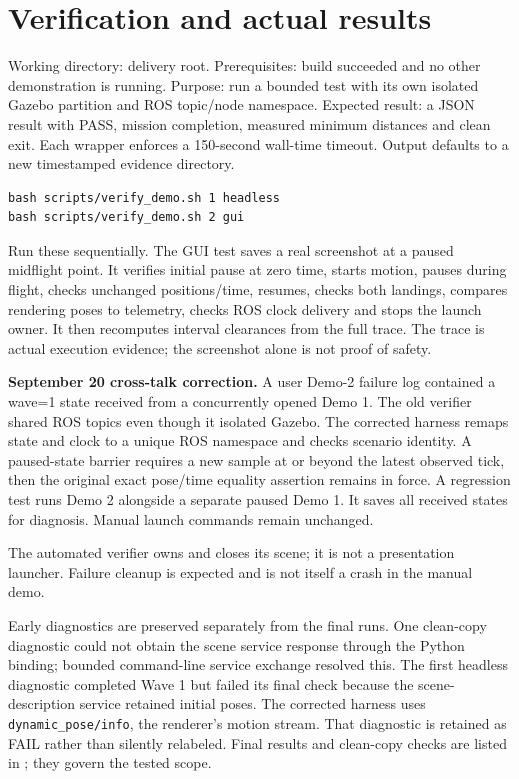 \section{Verification and actual results}
Working directory: delivery root. Prerequisites: build succeeded and no other demonstration is running. Purpose: run a bounded test with its own isolated Gazebo partition and ROS topic/node namespace. Expected result: a JSON result with PASS, mission completion, measured minimum distances and clean exit. Each wrapper enforces a 150-second wall-time timeout. Output defaults to a new timestamped evidence directory.
\begin{lstlisting}
bash scripts/verify_demo.sh 1 headless
bash scripts/verify_demo.sh 2 gui
\end{lstlisting}
Run these sequentially. The GUI test saves a real screenshot at a paused midflight point. It verifies initial pause at zero time, starts motion, pauses during flight, checks unchanged positions/time, resumes, checks both landings, compares rendering poses to telemetry, checks ROS clock delivery and stops the launch owner. It then recomputes interval clearances from the full trace. The trace is actual execution evidence; the screenshot alone is not proof of safety.

\textbf{September 20 cross-talk correction.} A user Demo-2 failure log contained a wave=1 state received from a concurrently opened Demo 1. The old verifier shared ROS topics even though it isolated Gazebo. The corrected harness remaps state and clock to a unique ROS namespace and checks scenario identity. A paused-state barrier requires a new sample at or beyond the latest observed tick, then the original exact pose/time equality assertion remains in force. A regression test runs Demo 2 alongside a separate paused Demo 1. It saves all received states for diagnosis. Manual launch commands remain unchanged.

The automated verifier owns and closes its scene; it is not a presentation launcher. Failure cleanup is expected and is not itself a crash in the manual demo.

Early diagnostics are preserved separately from the final runs. One clean-copy diagnostic could not obtain the scene service response through the Python binding; bounded command-line service exchange resolved this. The first headless diagnostic completed Wave 1 but failed its final check because the scene-description service retained initial poses. The corrected harness uses \texttt{dynamic\_pose/info}, the renderer's motion stream. That diagnostic is retained as FAIL rather than silently relabeled. Final results and clean-copy checks are listed in ; they govern the tested scope.

